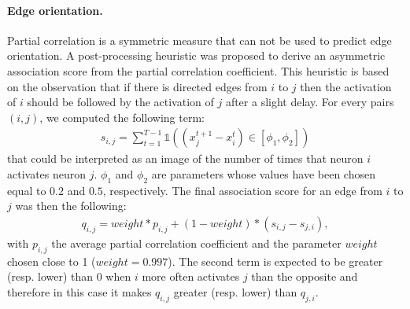 \documentclass[wcp]{jmlr}
\begin{document}
\paragraph{Edge orientation.}
Partial correlation is a symmetric measure that can not be used to predict edge
orientation. A post-processing heuristic was proposed to derive an asymmetric
association score from the partial correlation coefficient. This heuristic is
based on the observation that if there is directed edges from $i$ to $j$ then
the activation of $i$ should be followed by the activation of $j$ after a
slight delay. For every pairs $(i,j)$, we computed the following term:
\begin{align}
s_{i,j} = \sum_{t=1}^{T - 1} \mathbb{1}((x_j^{t+1} - x_i^t) \in \left[\phi_1, \phi_2\right])
\end{align}
that could be interpreted as an image of the number of times that neuron $i$
activates neuron $j$. $\phi_1$ and $\phi_2$ are parameters whose values have
been chosen equal to $0.2$ and $0.5$, respectively. The
final association score for an edge from $i$ to $j$ was
then the following:
\begin{align}
q_{i,j} = weight * p_{i,j} + (1-weight) * (s_{i,j}-s_{j,i}),
\label{eqn:qij}
\end{align}
with $p_{i,j}$ the average partial correlation coefficient and the parameter
$weight$ chosen close to 1 ($weight=0.997$). The second term is expected to be
greater (resp. lower) than 0 when $i$ more often activates $j$ than the
opposite and therefore in this case it makes $q_{i,j}$ greater (resp. lower)
than $q_{j,i}$.
\newpage

\end{document}
